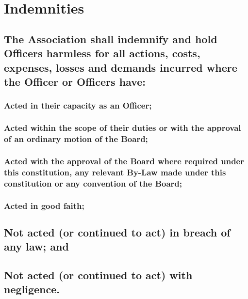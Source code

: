 \documentclass{article}
\newenvironment{subs}
  {\adjustwidth{2em}{0pt}}
  {\endadjustwidth}
\begin{document}
\section{Indemnities}
\begin{subs}
\subsection{The Association shall indemnify and hold Officers harmless for all actions, costs, expenses, losses and demands incurred where the Officer or Officers have:}
\begin{subs}
\subsubsection{Acted in their capacity as an Officer;}
\subsubsection{Acted within the scope of their duties or with the approval of an ordinary motion of the Board;}
\subsubsection{Acted with the approval of the Board where required under this constitution, any relevant By-Law made under this constitution or any convention of the Board;}
\subsubsection{Acted in good faith;}
\subsection{Not acted (or continued to act) in breach of any law; and}
\subsection{Not acted (or continued to act) with negligence.}
\end{subs}
\end{subs}
\end{document}
